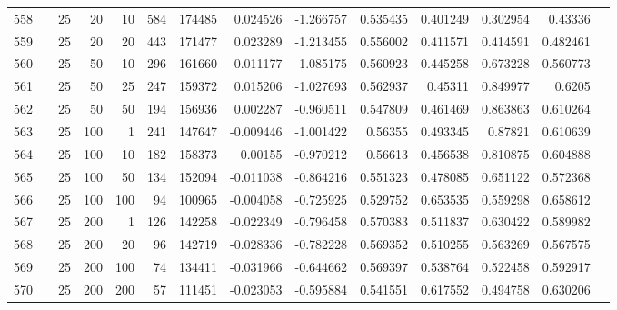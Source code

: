 \begin{longtable}{llrrrrrrrrrrrr}
		558 & &           25 &                20 &           10 &         584 &     174485 &  0.024526 & -1.266757 &  0.535435 &    0.401249 &       0.302954 &   0.43336 \\
		559 & &           25 &                20 &           20 &         443 &     171477 &  0.023289 & -1.213455 &  0.556002 &    0.411571 &       0.414591 &  0.482461 \\
		560 & &           25 &                50 &           10 &         296 &     161660 &  0.011177 & -1.085175 &  0.560923 &    0.445258 &       0.673228 &  0.560773 \\
		561 & &           25 &                50 &           25 &         247 &     159372 &  0.015206 & -1.027693 &  0.562937 &     0.45311 &       0.849977 &    0.6205 \\
		562 & &           25 &                50 &           50 &         194 &     156936 &  0.002287 & -0.960511 &  0.547809 &    0.461469 &       0.863863 &  0.610264 \\
		563 & &           25 &               100 &            1 &         241 &     147647 & -0.009446 & -1.001422 &   0.56355 &    0.493345 &        0.87821 &  0.610639 \\
		564 & &           25 &               100 &           10 &         182 &     158373 &   0.00155 & -0.970212 &   0.56613 &    0.456538 &       0.810875 &  0.604888 \\
		565 & &           25 &               100 &           50 &         134 &     152094 & -0.011038 & -0.864216 &  0.551323 &    0.478085 &       0.651122 &  0.572368 \\
		566 & &           25 &               100 &          100 &          94 &     100965 & -0.004058 & -0.725925 &  0.529752 &    0.653535 &       0.559298 &  0.658612 \\
		567 & &           25 &               200 &            1 &         126 &     142258 & -0.022349 & -0.796458 &  0.570383 &    0.511837 &       0.630422 &  0.589982 \\
		568 & &           25 &               200 &           20 &          96 &     142719 & -0.028336 & -0.782228 &  0.569352 &    0.510255 &       0.563269 &  0.567575 \\
		569 & &           25 &               200 &          100 &          74 &     134411 & -0.031966 & -0.644662 &  0.569397 &    0.538764 &       0.522458 &  0.592917 \\
		570 & &           25 &               200 &          200 &          57 &     111451 & -0.023053 & -0.595884 &  0.541551 &    0.617552 &       0.494758 &  0.630206 \\

\end{longtable}
